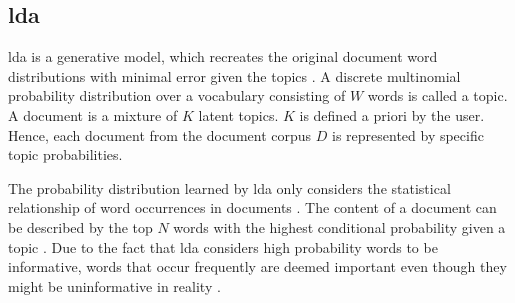 \subsection{\acl*{lda}}\label{subsec:latent-dirichlet-allocation}

\ac{lda} is a generative model, which recreates the original document word distributions with minimal error given the topics \cite{topic_modeling2015, Top2Vec2020}.
A discrete multinomial probability distribution over a vocabulary consisting of $W$ words is called a topic.
A document is a mixture of $K$ latent topics.
$K$ is defined a priori by the user.
Hence, each document from the document corpus $D$ is represented by specific topic probabilities.

The probability distribution learned by \ac{lda} only considers the statistical relationship of word occurrences in documents \cite{Topic2Vec2015}.
The content of a document can be described by the top $N$ words with the highest conditional probability given a topic \cite{Topic2Vec2015}.
Due to the fact that \ac{lda} considers high probability words to be informative, words 
that occur frequently are deemed important even though they might be uninformative in reality \cite{Top2Vec2020, Topic2Vec2015}.
